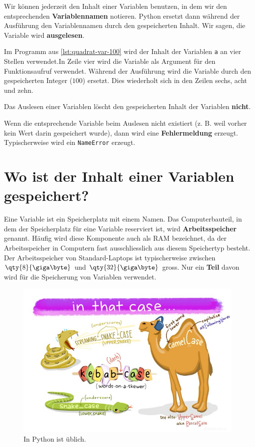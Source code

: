 Wir können jederzeit den Inhalt einer Variablen benutzen, in dem wir den entsprechenden \textbf{Variablennamen} notieren. Python ersetzt dann während der Ausführung den Variablennamen durch den gespeicherten Inhalt. Wir sagen, die Variable wird \textbf{ausgelesen}.

\begin{example}
Im Programm aus \autoref{lst:quadrat-var-100} wird der Inhalt der Variablen \lstinline[language={python3}]{a} an vier Stellen verwendet.In Zeile vier wird die Variable als Argument für den Funktionsaufruf verwendet. Während der Ausführung wird die Variable durch den gespeicherten Integer ($100$) ersetzt. Dies wiederholt sich in den Zeilen sechs, acht und zehn.
\end{example}

\begin{important}
Das Auslesen einer Variablen löscht den gespeicherten Inhalt der Variablen \textbf{nicht}.
\end{important}

\begin{hinweis}
Wenn die entsprechende Variable beim Auslesen nicht existiert (z. B. weil vorher kein Wert darin gespeichert wurde), dann wird eine \textbf{Fehlermeldung} erzeugt. Typischerweise wird ein \texttt{NameError} erzeugt.
\end{hinweis}

\section{Wo ist der Inhalt einer Variablen gespeichert?}
\label{sec:wo-ist-der-inhalt-einer-variablen-gespeichert}

Eine Variable ist ein Speicherplatz mit einem Namen. Das Computerbauteil, in dem der Speicherplatz für eine Variable reserviert ist, wird \textbf{Arbeitsspeicher} genannt. Häufig wird diese Komponente auch als \ac{RAM} bezeichnet, da der Arbeitsspeicher in Computern fast ausschliesslich aus diesem Speichertyp besteht. Der Arbeitsspeicher von Standard-Laptops ist typischerweise zwischen $\qty{8}{\giga\byte}$ und $\qty{32}{\giga\byte}$ gross. Nur ein \textbf{Teil} davon wird für die Speicherung von Variablen verwendet.

\begin{figure}[H]
\centering
\includegraphics[width=\textwidth]{naming_conventions}
\caption{In Python ist \protect{} üblich.\protect\footnotemark}
\label{figure-naming-conventions}
\end{figure}

